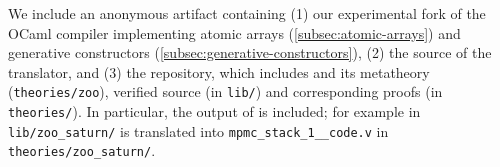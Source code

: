We include an anonymous artifact containing (1) our experimental fork of the OCaml compiler implementing atomic arrays (\cref{subsec:atomic-arrays}) and generative constructors (\cref{subsec:generative-constructors}), (2) the source of the \ocamlToZoo translator, and (3) the \Zoo repository, which includes \ZooLang and its metatheory (\texttt{theories/zoo}), verified \OCaml source (in \texttt{lib/}) and corresponding proofs (in \texttt{theories/}).
In particular, the output of \ocamlToZoo is included; for example  in \texttt{lib/zoo\_saturn/} is translated into \texttt{mpmc\_stack\_1\_\_code.v} in \texttt{theories/zoo\_saturn/}.


